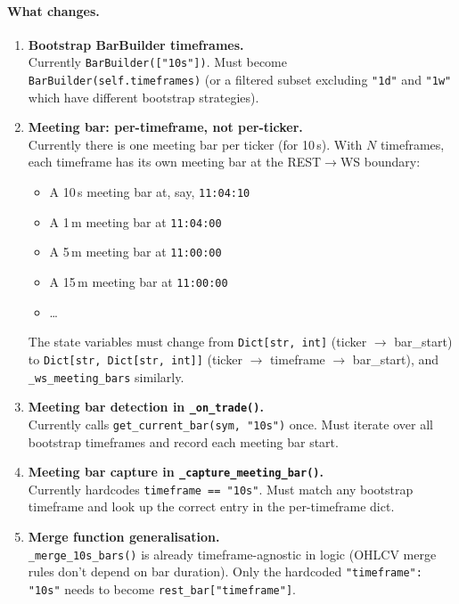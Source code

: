 \documentclass[a4paper, 11pt]{article}
\begin{document}
\paragraph{What changes.}
\begin{enumerate}
    \item \textbf{Bootstrap BarBuilder timeframes.} \\
    Currently \texttt{BarBuilder(["10s"])}.  Must become
    \texttt{BarBuilder(self.timeframes)} (or a filtered subset excluding
    \texttt{"1d"} and \texttt{"1w"} which have different bootstrap strategies).

    \item \textbf{Meeting bar: per-timeframe, not per-ticker.} \\
    Currently there is one meeting bar per ticker (for 10\,s).  With $N$ timeframes,
    each timeframe has its own meeting bar at the REST$\to$WS boundary:
    \begin{itemize}[nosep]
        \item A 10\,s meeting bar at, say, \texttt{11:04:10}
        \item A 1\,m meeting bar at \texttt{11:04:00}
        \item A 5\,m meeting bar at \texttt{11:00:00}
        \item A 15\,m meeting bar at \texttt{11:00:00}
        \item \ldots
    \end{itemize}
    The state variables must change from \texttt{Dict[str, int]} (ticker $\to$ bar\_start)
    to \texttt{Dict[str, Dict[str, int]]} (ticker $\to$ timeframe $\to$ bar\_start),
    and \texttt{\_ws\_meeting\_bars} similarly.

    \item \textbf{Meeting bar detection in \texttt{\_on\_trade()}.} \\
    Currently calls \texttt{get\_current\_bar(sym, "10s")} once.  Must iterate over
    all bootstrap timeframes and record each meeting bar start.

    \item \textbf{Meeting bar capture in \texttt{\_capture\_meeting\_bar()}.} \\
    Currently hardcodes \texttt{timeframe == "10s"}.  Must match any bootstrap
    timeframe and look up the correct entry in the per-timeframe dict.

    \item \textbf{Merge function generalisation.} \\
    \texttt{\_merge\_10s\_bars()} is already timeframe-agnostic in logic (OHLCV merge
    rules don't depend on bar duration).  Only the hardcoded \texttt{"timeframe": "10s"}
    needs to become \texttt{rest\_bar["timeframe"]}.


\end{enumerate}
\end{document}
